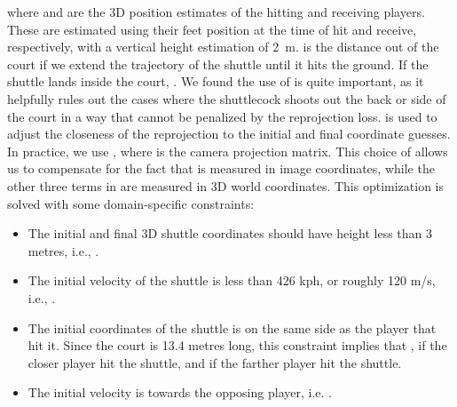 where  and  are the 3D position estimates of the hitting and receiving players. These are estimated using their feet position at the time of hit and receive, respectively, with a vertical height estimation of \SI{2}{m}.  is the distance out of the court if we extend the trajectory of the shuttle until it hits the ground. If the shuttle lands inside the court, . We found the use of  is quite important, as it helpfully rules out the cases where the shuttlecock shoots out the back or side of the court in a way that cannot be penalized by the reprojection loss.  is used to adjust the closeness of the reprojection to the initial and final coordinate guesses. In practice, we use , where  is the camera projection matrix. This choice of  allows us to compensate for the fact that  is measured in image coordinates, while the other three terms in  are measured in 3D world coordinates. This optimization is solved with some domain-specific constraints:
\begin{itemize}
    \item The initial and final 3D shuttle coordinates should have height less than 3 metres, i.e., .
    \item The initial velocity of the shuttle is less than 426 kph, or roughly 120 m/s, i.e., .
    \item The initial coordinates of the shuttle is on the same side as the player that hit it. Since the court is 13.4 metres long, this constraint implies that ,  if the closer player hit the shuttle, and  if the farther player hit the shuttle.
    \item The initial velocity is towards the opposing player, i.e. .
\end{itemize}

